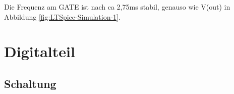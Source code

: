 \documentclass[paper=a4, 12pt]{scrreprt}
\begin{document}
			Die Frequenz am GATE ist nach ca 2,75ms stabil, genauso wie V(out) in Abbildung \ref{fig:LTSpice-Simulation-1}. 
			\pagebreak
			
	\section{Digitalteil}
		\subsection{Schaltung}


\appendix



\setcounter{lofdepth}{2}
\dipalistoffigures

\setcounter{lotdepth}{2}
\dipalistoftables








\end{document}
